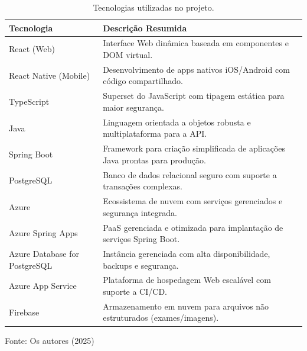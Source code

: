 \documentclass[conference,a4paper,10pt]{IEEETran}
\begin{document}
\begin{table}[H]
    \centering
    \caption{Tecnologias utilizadas no projeto.}
    \label{tab:tecnologias}
    
    \footnotesize 
    
    \begin{tabularx}{\columnwidth}{|p{}|X|}
        \hline
        \textbf{Tecnologia} & \textbf{Descrição Resumida} \\ \hline
        React (Web) & Interface Web dinâmica baseada em componentes e DOM virtual. \\ \hline
        React Native (Mobile) & Desenvolvimento de apps nativos iOS/Android com código compartilhado. \\ \hline
        TypeScript & Superset do JavaScript com tipagem estática para maior segurança. \\ \hline
        Java & Linguagem orientada a objetos robusta e multiplataforma para a API. \\ \hline
        Spring Boot & Framework para criação simplificada de aplicações Java prontas para produção. \\ \hline
        PostgreSQL & Banco de dados relacional seguro com suporte a transações complexas. \\ \hline
        Azure & Ecossistema de nuvem com serviços gerenciados e segurança integrada. \\ \hline
        Azure Spring Apps & PaaS gerenciada e otimizada para implantação de serviços Spring Boot. \\ \hline
        Azure Database for PostgreSQL & Instância gerenciada com alta disponibilidade, backups e segurança. \\ \hline
        Azure App Service & Plataforma de hospedagem Web escalável com suporte a CI/CD. \\ \hline
        Firebase & Armazenamento em nuvem para arquivos não estruturados (exames/imagens). \\ \hline
    \end{tabularx}
    
    \vspace{2mm}
    {\footnotesize Fonte: Os autores (2025)}
\end{table}

\end{document}
